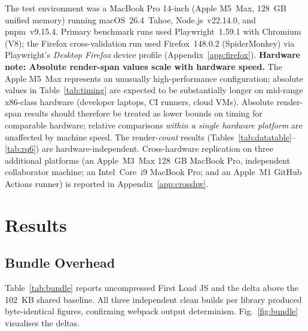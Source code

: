 \documentclass[conference]{IEEEtran}
\begin{document}
The test environment was a MacBook Pro 14-inch (Apple M5~Max, 128~GB
unified memory) running macOS~26.4~Tahoe, Node.js~v22.14.0, and
pnpm~v9.15.4. Primary benchmark runs used Playwright~1.59.1 with
Chromium (V8); the Firefox cross-validation run used
Firefox~148.0.2 (SpiderMonkey) via Playwright's \textit{Desktop Firefox}
device profile (Appendix~\ref{app:firefox}). \textbf{Hardware note:
Absolute render-span values scale with hardware speed.}  The Apple
M5~Max represents an unusually high-performance configuration;
absolute values in Table~\ref{tab:timing} are expected to be
substantially longer on mid-range x86-class hardware (developer
laptops, CI runners, cloud VMs).  Absolute render-span results should
therefore be treated as lower bounds on timing for comparable
hardware; relative comparisons \emph{within a single hardware
platform} are unaffected by machine speed.  The render-\emph{count}
results (Tables~\ref{tab:datatable}--\ref{tab:rq6}) are
hardware-independent.
Cross-hardware replication on three additional platforms (an
Apple~M3~Max 128~GB MacBook Pro, independent collaborator machine; an
Intel~Core~i9 MacBook Pro; and an Apple~M1 GitHub Actions runner) is
reported in Appendix~\ref{app:crosshw}.

\section{Results}
\label{sec:results}

\subsection{Bundle Overhead}

Table~\ref{tab:bundle} reports uncompressed First Load JS and the delta
above the 102~KB shared baseline. All three independent clean builds per
library produced byte-identical figures, confirming webpack output
determinism. Fig.~\ref{fig:bundle} visualises the deltas.
\end{document}
